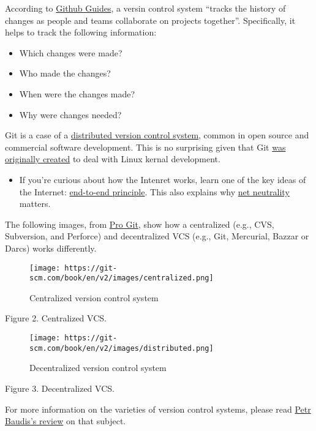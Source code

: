 \documentclass[
]{book}
\providecommand{\tightlist}{%
  \setlength{\itemsep}{0pt}\setlength{\parskip}{0pt}}
\begin{document}
According to \href{https://guides.github.com}{Github Guides}, a versin control system ``tracks the history of changes as people and teams collaborate on projects together''. Specifically, it helps to track the following information:

\begin{itemize}
\tightlist
\item
  Which changes were made?
\item
  Who made the changes?
\item
  When were the changes made?
\item
  Why were changes needed?
\end{itemize}

Git is a case of a \href{https://en.wikipedia.org/wiki/Distributed_version_control}{distributed version control system}, common in open source and commercial software development. This is no surprising given that Git \href{https://lkml.org/lkml/2005/4/6/121}{was originally created} to deal with Linux kernal development.

\begin{itemize}
\tightlist
\item
  If you're curious about how the Intenret works, learn one of the key ideas of the Internet: \href{https://en.wikipedia.org/wiki/End-to-end_principle}{end-to-end principle}. This also explains why \href{https://en.wikipedia.org/wiki/Net_neutrality}{net neutrality} matters.
\end{itemize}

The following images, from \href{git-scm.com}{Pro Git}, show how a centralized (e.g., CVS, Subversion, and Perforce) and decentralized VCS (e.g., Git, Mercurial, Bazzar or Darcs) works differently.

\begin{figure}
\centering
\texttt{[image: https://git-scm.com/book/en/v2/images/centralized.png]}
\caption{Centralized version control system}
\end{figure}

Figure 2. Centralized VCS.

\begin{figure}
\centering
\texttt{[image: https://git-scm.com/book/en/v2/images/distributed.png]}
\caption{Decentralized version control system}
\end{figure}

Figure 3. Decentralized VCS.

For more information on the varieties of version control systems, please read \href{https://pdfs.semanticscholar.org/4490/4c70bc91e1bed4fe02b9e2282f031b7c90ea.pdf}{Petr Baudis's review} on that subject.
\end{document}
